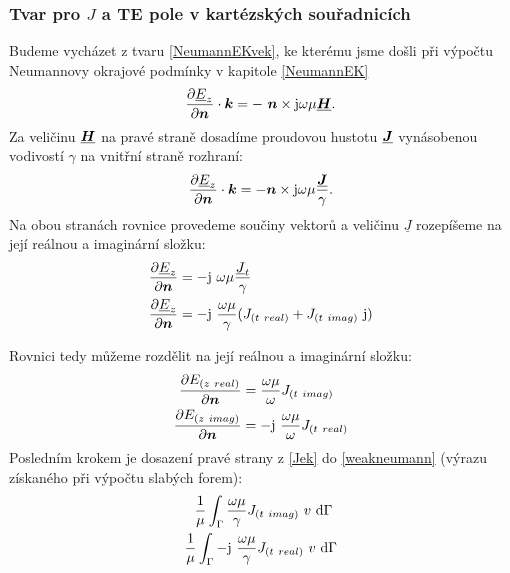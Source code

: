 \documentclass[12pt,a4paper,oneside]{article}
\numberwithin{equation}{section} %
\numberwithin{figure}{section} %
\numberwithin{table}{section} %
\newcommand{\mj}{\mathrm{j}} %
\renewcommand{\vec}[1]{\mbox{\boldmath$#1$}} %
\newcommand{\faz}[1]{{\underline{#1}}} %
\begin{document}
\subsubsection*{Tvar pro \faz{\vec{J}} a TE pole v kartézských souřadnicích}
Budeme vycházet z tvaru \ref{NeumannEKvek}, ke kterému jsme došli při výpočtu Neumannovy okrajové podmínky v kapitole \ref{NeumannEK}
\begin{equation}
\frac{\partial \faz{E}_z}{\partial \vec{n}} \cdot \vec{k} = - ~ \vec{n} \times \mj \omega \mu \faz{\vec{H}}.
\end{equation}
Za veličinu $\faz{\vec{H}}$ na pravé straně dosadíme proudovou hustotu $\faz{\vec{J}}$ vynásobenou vodivostí $\gamma$ na vnitřní straně rozhraní:
\begin{equation}
\frac{\partial \faz{E}_z}{\partial \vec{n}} \cdot \vec{k} = - \vec{n} \times \mj \omega \mu \frac{\faz{\vec{J}}}{\gamma}.
\end{equation}
Na obou stranách rovnice provedeme součiny vektorů a veličinu $\faz{J}$ rozepíšeme na její reálnou a imaginární složku:
\begin{subequations}
\begin{align}
\frac{\partial \faz{E}_z}{\partial \vec{n}} &= - \mj ~ \omega \mu \frac{\faz{J} _t}{\gamma}
\\
\frac{\partial \faz{E}_z}{\partial \vec{n}} &= - \mj ~ \frac{\omega \mu}{\gamma} (J _{(t~real)} + J _{(t~imag)} ~ \mj)
\end{align}
\end{subequations}

Rovnici tedy můžeme rozdělit na její reálnou a imaginární složku:
\begin{subequations}
\label{Jek}
\begin{align}
\frac{\partial E _{(z~real)}}{\partial \vec{n}} &= \frac{\omega \mu}{\omega}  J _{(t~imag)}
\\
\frac{\partial E _{(z~imag)}}{\partial \vec{n}} &= - \mj ~ \frac{\omega \mu}{\omega} J _{(t~real)}
\end{align}
\end{subequations}
Posledním krokem je dosazení pravé strany z \ref{Jek} do \ref{weakneumann} (výrazu získaného při výpočtu slabých forem):
\begin{subequations}
\begin{align}
\frac{1}{\mu} \int _{\Gamma} \frac{\omega \mu}{\gamma} J _{(t~imag)} ~ v ~ \ud \Gamma ~
\\
\frac{1}{\mu} \int _{\Gamma} - \mj ~ \frac{\omega \mu}{\gamma} J _{(t~real)} ~ v ~ \ud \Gamma
\end{align}
\end{subequations}
\end{document}
